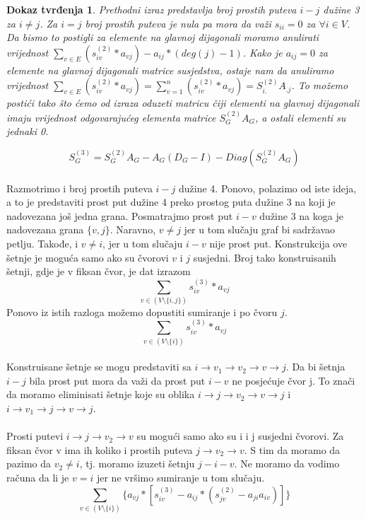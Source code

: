 \documentclass[11pt]{article}
\newtheorem*{custom_proof}{Dokaz tvrđenja}
\begin{document}
\begin{custom_proof}
			Prethodni izraz predstavlja broj prostih puteva $i-j$ dužine 3 za $i \neq j$. 
			Za $i = j$ broj prostih puteva je nula pa mora da važi $s_{ii} = 0$ za $\forall i \in V$. 
			Da bismo to postigli za elemente na glavnoj dijagonali moramo anulirati vrijednost $\sum_{v \in E} (s_{iv}^{(2)} * a_{vj}) - a_{ij} * (deg(j)  - 1)$.
			Kako je $a_{ij} = 0$ za elemente na glavnoj dijagonali matrice susjedstva, ostaje nam da anuliramo vrijednost $\sum_{v \in E} (s_{iv}^{(2)}*a_{vj}) = \sum_{v = 1}^{n} (s_{iv}^{(2)}*a_{vj}) = S_{i.}^{(2)} A_{.j}$.
			To možemo postići tako što ćemo od izraza oduzeti matricu čiji elementi na glavnoj dijagonali imaju vrijednost odgovarajućeg elementa matrice $S_G^{(2)} A_G$, a ostali elementi su jednaki 0.
			
			\[
				S_G^{(3)} = S_G^{(2)} A_G - A_G (D_G - I) - Diag(S_G^{(2)} A_G)
			\]
			\end{custom_proof}
	
			\paragraph{}
			Razmotrimo i broj prostih puteva $i-j$ dužine 4. Ponovo, polazimo od iste ideja, a to je predstaviti prost put dužine 4 preko prostog puta dužine 3 na koji je nadovezana još jedna grana.
			Posmatrajmo prost put $i-v$ dužine 3 na koga je nadovezana grana $\{v,j\}$. Naravno, $v \neq j$ jer u tom slučaju graf bi sadržavao petlju. Takođe, i $v \neq i$, jer u tom slučaju $i-v$ nije prost put.
			Konstrukcija ove šetnje je moguća samo ako su čvorovi $v$ i $j$ susjedni. Broj tako konstruisanih šetnji, gdje je v fiksan čvor, je dat izrazom
			\[
				\sum_{v \in  (V \setminus \{i,j\})} s_{iv}^{(3)} * a_{vj}
			\]
			Ponovo iz istih razloga možemo dopustiti sumiranje i po čvoru $j$.
			\[
				\sum_{v \in (V \setminus \{i\})} s_{iv}^{(3)} * a_{vj}
			\]

			\paragraph{}
			Konstruisane šetnje se mogu predstaviti sa $i \rightarrow v_1 \rightarrow v_2 \rightarrow v \rightarrow j$. 
			Da bi šetnja $i-j$ bila prost put mora da važi da prost put $i-v$ ne posjećuje čvor j.
			To znači da moramo eliminisati šetnje koje su oblika $i \rightarrow j \rightarrow v_2 \rightarrow v \rightarrow j$ i $i \rightarrow v_1 \rightarrow j \rightarrow v \rightarrow j$. 
	
			\paragraph{}
			Prosti putevi $i \rightarrow j \rightarrow v_2 \rightarrow v$ su mogući samo ako su i i j susjedni čvorovi. Za fiksan čvor v ima ih koliko i prostih puteva $j \rightarrow v_2 \rightarrow v$. 
			S tim da moramo da pazimo da $v_2 \neq i$, tj. moramo izuzeti šetnju $j-i-v$. Ne moramo da vodimo računa da li je $v=i$ jer ne vršimo sumiranje u tom slučaju.
			\[
				\sum_{v \in (V \setminus \{i\})} \{a_{vj} * [s_{iv}^{(3)} - a_{ij} * (s_{jv}^{(2)} - a_{ji}a_{iv})]\}
			\]
		
\end{document}
